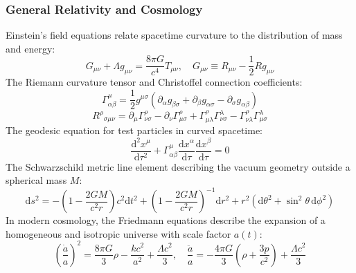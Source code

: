 \documentclass[11pt, a4paper]{article}
\begin{document}
\subsubsection{General Relativity and Cosmology}
Einstein's field equations relate spacetime curvature to the distribution of mass and energy:
\begin{equation}
G_{\mu\nu} + \Lambda g_{\mu\nu} = \frac{8 \pi G}{c^4} T_{\mu\nu}, \quad G_{\mu\nu} \equiv R_{\mu\nu} - \frac{1}{2} R g_{\mu\nu}
\end{equation}
The Riemann curvature tensor and Christoffel connection coefficients:
\begin{equation}
\Gamma^\mu_{\alpha\beta} = \frac{1}{2} g^{\mu\sigma} \left( \partial_\alpha g_{\beta\sigma} + \partial_\beta g_{\alpha\sigma} - \partial_\sigma g_{\alpha\beta} \right)
\end{equation}
\begin{equation}
R^\rho{}_{\sigma\mu\nu} = \partial_\mu \Gamma^\rho_{\nu\sigma} - \partial_\nu \Gamma^\rho_{\mu\sigma} + \Gamma^\rho_{\mu\lambda} \Gamma^\lambda_{\nu\sigma} - \Gamma^\rho_{\nu\lambda} \Gamma^\lambda_{\mu\sigma}
\end{equation}
The geodesic equation for test particles in curved spacetime:
\begin{equation}
\frac{\mathrm{d}^2 x^\mu}{\mathrm{d}\tau^2} + \Gamma^\mu_{\alpha\beta} \frac{\mathrm{d}x^\alpha}{\mathrm{d}\tau} \frac{\mathrm{d}x^\beta}{\mathrm{d}\tau} = 0
\end{equation}
The Schwarzschild metric line element describing the vacuum geometry outside a spherical mass $M$:
\begin{equation}
\mathrm{d}s^2 = -\left( 1 - \frac{2GM}{c^2 r} \right) c^2 \mathrm{d}t^2 + \left( 1 - \frac{2GM}{c^2 r} \right)^{-1} \mathrm{d}r^2 + r^2 (\mathrm{d}\theta^2 + \sin^2\theta \, \mathrm{d}\phi^2)
\end{equation}
In modern cosmology, the Friedmann equations describe the expansion of a homogeneous and isotropic universe with scale factor $a(t)$:
\begin{equation}
\left( \frac{\dot{a}}{a} \right)^2 = \frac{8\pi G}{3} \rho - \frac{k c^2}{a^2} + \frac{\Lambda c^2}{3}, \quad \frac{\ddot{a}}{a} = -\frac{4\pi G}{3}\left( \rho + \frac{3p}{c^2} \right) + \frac{\Lambda c^2}{3}
\end{equation}
\end{document}
